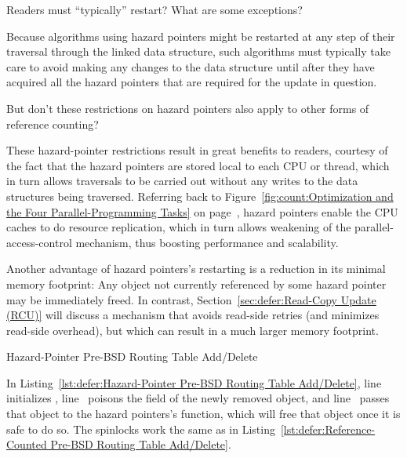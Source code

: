 \QuickQuiz{}
	Readers must ``typically'' restart?
	What are some exceptions?
 \QuickQuizEnd

Because algorithms using hazard pointers might be restarted at any
step of their traversal through the linked data structure, such algorithms
must typically take care to avoid making any changes to the data
structure until after they have acquired all the hazard pointers that
are required for the update in question.

\QuickQuiz{}
	But don't these restrictions on hazard pointers also apply
	to other forms of reference counting?
 \QuickQuizEnd

These hazard-pointer restrictions result in great benefits to readers,
courtesy of the fact that the hazard pointers are stored local to each
CPU or thread, which in turn allows traversals to be carried out without
any writes to the data structures being traversed.
Referring back to
Figure~\ref{fig:count:Optimization and the Four Parallel-Programming Tasks}
on
page~\pageref{fig:count:Optimization and the Four Parallel-Programming Tasks},
hazard pointers enable the CPU caches to do resource replication, which
in turn allows weakening of the parallel-access-control mechanism,
thus boosting performance and scalability.

Another advantage of hazard pointers's restarting is a reduction in its
minimal memory footprint:
Any object not currently referenced by some hazard pointer may be
immediately freed.
In contrast,
Section~\ref{sec:defer:Read-Copy Update (RCU)}
will discuss a mechanism that avoids read-side retries (and minimizes
read-side overhead), but which can result in a much larger memory
footprint.

\begin{listing}[tbp]

\caption{Hazard-Pointer Pre-BSD Routing Table Add\slash Delete}
\label{lst:defer:Hazard-Pointer Pre-BSD Routing Table Add/Delete}
\end{listing}

\begin{lineref}
In
Listing~\ref{lst:defer:Hazard-Pointer Pre-BSD Routing Table Add/Delete},
line~ initializes ,
line~ poisons the  field of the newly removed
object, and
line~ passes that object to the hazard pointers's
 function, which will free that object once it
is safe to do so.
The spinlocks work the same as in
Listing~\ref{lst:defer:Reference-Counted Pre-BSD Routing Table Add/Delete}.
\end{lineref}

